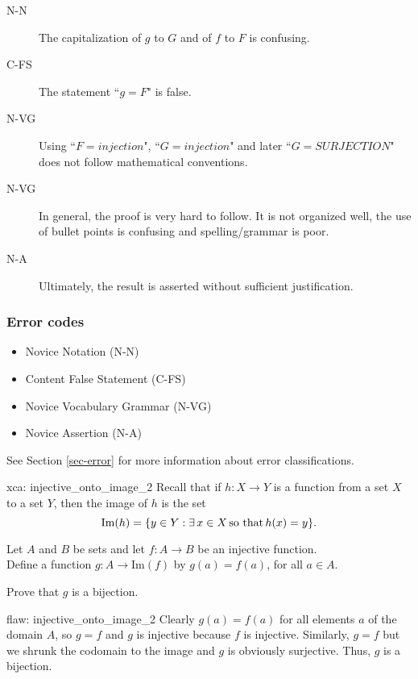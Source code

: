  \begin{description}
    \item[N-N] The capitalization of $g$ to $G$ and of $f$ to $F$ is confusing. 
    \item [C-FS] The statement ``$g=F$" is false. 
    \item[N-VG] Using ``$F = injection$", ``$G = injection$" and later ``$G = SURJECTION$" does not follow mathematical conventions. 
    \item[N-VG] In general, the proof is very hard to follow. It is not organized well, the use of bullet points is confusing and spelling/grammar is poor. 
    \item[N-A] Ultimately, the result is asserted without sufficient justification.
 \end{description}

 
\subsubsection{Error codes}
\begin{itemize}
    \item Novice Notation (N-N)
	\item Content False Statement (C-FS)
	\item Novice Vocabulary Grammar (N-VG)
	\item Novice Assertion (N-A)
\end{itemize}
See Section \ref{sec-error} for more information about error classifications.

\clearpage

\begin{xca}{xca: injective_onto_image_2}
Recall that if $h: X \rightarrow Y$ is a function from a set $X$ to a set $Y$, then the image of $h$ is the set 
\[\operatorname{Im}(h) = \{ y \in Y : \exists\, x \in X\, \text{so that}\, h(x) = y \}. \]

\noindent Let $A$ and $B$ be sets and let $f: A \to B$ be an injective function.\\ Define a function $g:A \to \text{Im}(f)$ by $g(a) = f(a)$, for all $a \in A$.

\noindent Prove that $g$ is a bijection. 
\end{xca}

\begin{flaw}{flaw: injective_onto_image_2} 
Clearly $g(a)=f(a)$ for all elements $a$ of the domain $A$, so $g=f$ and $g$ is injective because $f$ is injective.
Similarly, $g=f$ but we shrunk the codomain to the image and $g$ is obviously surjective.
Thus, $g$ is a bijection.
\end{flaw}

